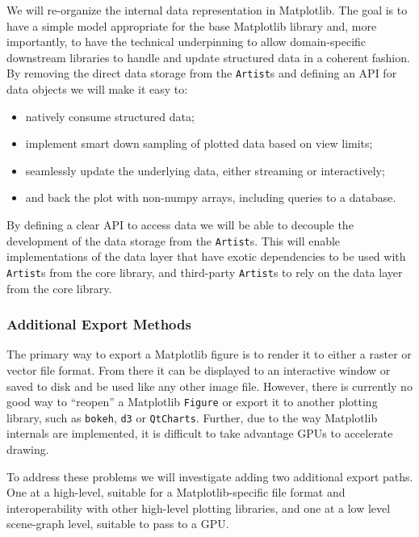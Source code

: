 \documentclass[11pt]{article}  %
\begin{document}
We will re-organize the internal data representation in Matplotlib.  The
goal is to have a simple model appropriate for the base Matplotlib
library and, more importantly, to have the technical underpinning to
allow domain-specific downstream libraries to handle and update
structured data in a coherent fashion.
By removing the direct data storage from the \texttt{Artist}s and
defining an API for data objects we will make it easy to:
\begin{itemize}[noitemsep]
  \item natively consume structured data;
  \item implement smart down sampling of plotted data based on view
    limits;
  \item seamlessly update the underlying data, either
    streaming or interactively;
  \item and back the plot with non-numpy arrays, including queries to
    a database.
\end{itemize}
By defining a clear API to access data we will be able to decouple
the development of the data storage from the \texttt{Artist}s.
This will enable implementations of the data layer that have exotic
dependencies to be used with \texttt{Artist}s from the core library,
and third-party \texttt{Artist}s to rely on the data layer from the
core library.



\subsubsection{Additional Export Methods}

The primary way to export a Matplotlib figure is to render it to
either a raster or vector file format.  From there it can be displayed
to an interactive window or saved to disk and be used like any other
image file.  However, there is currently no good way to ``reopen'' a
Matplotlib \texttt{Figure} or export it to another plotting library,
such as \texttt{bokeh}, \texttt{d3} or \texttt{QtCharts}.
Further, due to the way Matplotlib internals are implemented, it
is difficult to take advantage GPUs to accelerate drawing.

To address these problems we will investigate adding two additional
export paths.  One at a high-level, suitable for a Matplotlib-specific
file format and interoperability with other high-level plotting
libraries, and one at a low level scene-graph level, suitable to pass
to a GPU.
\end{document}
